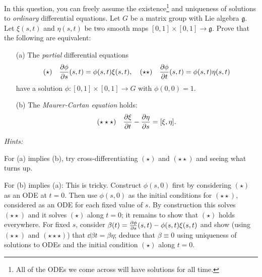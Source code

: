\documentclass[12pt]{article}
\begin{document}
\begin{question}
In this question, you can freely assume the existence\footnote{All of the ODEs we come across will have solutions for all time.} and uniqueness of solutions to {\em ordinary} differential equations. Let $G$ be a matrix group with Lie algebra $\mathfrak{g}$. Let $\xi(s,t)$ and $\eta(s,t)$ be two smooth maps $[0,1]\times[0,1]\to\mathfrak{g}$. Prove that the following are equivalent:
\begin{enumerate}
\item[(a)] The {\em partial} differential equations
\[(\star)\quad\frac{\partial \phi}{\partial s}(s,t)=\phi(s,t)\xi(s,t),\quad(\star\star)\quad\frac{\partial \phi}{\partial t}(s,t)=\phi(s,t)\eta(s,t)\]
have a solution $\phi\colon [0,1]\times[0,1]\to G$ with $\phi(0,0)=1$.
\item[(b)] The {\em Maurer-Cartan equation} holds:
\[(\star\star\star)\quad\frac{\partial \xi}{\partial t}-\frac{\partial \eta}{\partial s}=[\xi,\eta].\]
\end{enumerate}
{\em Hints:

For (a) implies (b), try cross-differentiating $(\star)$ and $(\star\star)$ and seeing what turns up.

For (b) implies (a): This is tricky. Construct $\phi(s,0)$ first by considering $(\star)$ as an ODE at $t=0$. Then use $\phi(s,0)$ as the initial conditions for $(\star\star)$, considered as an ODE for each fixed value of $s$. By construction this solves $(\star\star)$ and it solves $(\star)$ along $t=0$; it remains to show that $(\star)$ holds everywhere. For fixed $s$, consider $\beta(t)=\frac{\partial \phi}{\partial s}(s,t)-\phi(s,t)\xi(s,t)$ and show (using $(\star\star)$ and $(\star\star\star)$) that $\dd{\beta}{t}=\beta\eta$; deduce that $\beta\equiv 0$ using uniqueness of solutions to ODEs and the initial condition $(\star)$ along $t=0$.}
\end{question}
\end{document}
